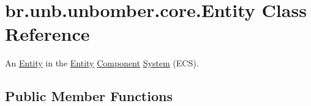 \hypertarget{classbr_1_1unb_1_1unbomber_1_1core_1_1_entity}{\section{br.\+unb.\+unbomber.\+core.\+Entity Class Reference}
\label{classbr_1_1unb_1_1unbomber_1_1core_1_1_entity}
}


An \hyperlink{classbr_1_1unb_1_1unbomber_1_1core_1_1_entity}{Entity} in the \hyperlink{classbr_1_1unb_1_1unbomber_1_1core_1_1_entity}{Entity} \hyperlink{classbr_1_1unb_1_1unbomber_1_1core_1_1_component}{Component} \hyperlink{interfacebr_1_1unb_1_1unbomber_1_1core_1_1_system}{System} (E\+C\+S).  


\subsection*{Public Member Functions}
